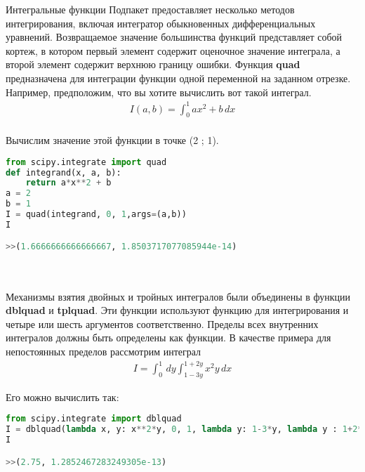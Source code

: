 \documentclass{article}
\begin{document}
\begin{section}{Интегральные функции}
Подпакет предоставляет несколько методов интегрирования, включая интегратор обыкновенных дифференциальных уравнений. Возвращаемое значение большинства функций представляет собой кортеж, в котором первый элемент содержит оценочное значение интеграла, а второй элемент содержит верхнюю границу ошибки.
\newpage
Функция \textbf{quad} предназначена для интеграции функции одной переменной на заданном отрезке. Например, предположим, что вы хотите вычислить вот такой интеграл.
\begin{align*}
I(a,b)=\int_{0}^{1} ax^2+b \,dx
\end{align*}  
\\Вычислим значение этой функции в точке (2 ; 1).
\begin{lstlisting}[language=Python]
from scipy.integrate import quad
def integrand(x, a, b):
    return a*x**2 + b
a = 2
b = 1
I = quad(integrand, 0, 1,args=(a,b))
I

>>(1.6666666666666667, 1.8503717077085944e-14)
\end{lstlisting}
\\
\\
Механизмы взятия двойных и тройных интегралов были объединены в функции \textbf{dblquad} и \textbf{tplquad}. Эти функции используют функцию для интегрирования и четыре или шесть аргументов соответственно. Пределы всех внутренних интегралов должны быть определены как функции.
В качестве примера для непостоянных пределов рассмотрим интеграл\\
\begin{align*}
I=\int_{0}^{1}\,dy\int_{1-3y}^{1+2y} x^2y \,dx  
\end{align*}

 Его можно вычислить так:
 \\
 \begin{lstlisting}[language=Python]
from scipy.integrate import dblquad
I = dblquad(lambda x, y: x**2*y, 0, 1, lambda y: 1-3*y, lambda y : 1+2*y)
I

>>(2.75, 1.2852467283249305e-13)
\end{lstlisting}
\end{section}
\end{document}
